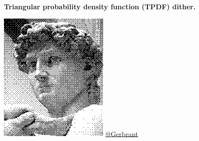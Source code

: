 \documentclass[usenames,dvipsnames, 18pt, compress, aspectratio=169]{beamer}
\begin{document}
\begin{frame}[fragile]{}
    \frametitle{}
    \begin{center}
        \textbf{Triangular probability density function (TPDF) dither.}
        \vspace{0.2cm}

        \includegraphics[width=0.4\textwidth]{dither.png}
        \href{https://en.wikipedia.org/wiki/Dither#/media/File:Michelangelo's_David_-_Bayer.png}
             {\color{black}\fontsize{5pt}{0}\selectfont @Gerbrant}

    \end{center}
\end{frame}







\end{document}
